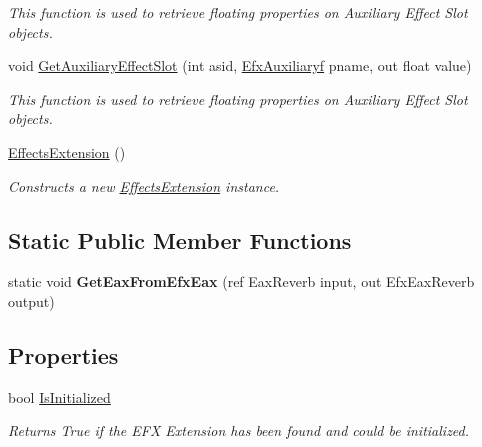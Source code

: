 \begin{DoxyCompactItemize}
\begin{DoxyCompactList}\small\item\em This function is used to retrieve floating properties on Auxiliary Effect Slot objects.\end{DoxyCompactList}\item 
void \hyperlink{class_open_t_k_1_1_audio_1_1_open_a_l_1_1_effects_extension_a5f6f92274a592df0ea8ab4dfd3780c37}{Get\-Auxiliary\-Effect\-Slot} (int asid, \hyperlink{namespace_open_t_k_1_1_audio_1_1_open_a_l_ad4eb76e6214aa11619cd342b8ab6acbd}{Efx\-Auxiliaryf} pname, out float value)
\begin{DoxyCompactList}\small\item\em This function is used to retrieve floating properties on Auxiliary Effect Slot objects.\end{DoxyCompactList}\item 
\hyperlink{class_open_t_k_1_1_audio_1_1_open_a_l_1_1_effects_extension_a1923f40f555058b0e102711601559731}{Effects\-Extension} ()
\begin{DoxyCompactList}\small\item\em Constructs a new \hyperlink{class_open_t_k_1_1_audio_1_1_open_a_l_1_1_effects_extension}{Effects\-Extension} instance. \end{DoxyCompactList}\end{DoxyCompactItemize}
\subsection*{Static Public Member Functions}
\begin{DoxyCompactItemize}
\item 
\hypertarget{class_open_t_k_1_1_audio_1_1_open_a_l_1_1_effects_extension_a0b335b4f0da12f920bf9cdd6f17a3df5}{static void {\bfseries Get\-Eax\-From\-Efx\-Eax} (ref Eax\-Reverb input, out Efx\-Eax\-Reverb output)}\label{class_open_t_k_1_1_audio_1_1_open_a_l_1_1_effects_extension_a0b335b4f0da12f920bf9cdd6f17a3df5}

\end{DoxyCompactItemize}
\subsection*{Properties}
\begin{DoxyCompactItemize}
\item 
bool \hyperlink{class_open_t_k_1_1_audio_1_1_open_a_l_1_1_effects_extension_a760975f853f917b2e4bcec05ffa73cca}{Is\-Initialized}
\begin{DoxyCompactList}\small\item\em Returns True if the E\-F\-X Extension has been found and could be initialized.\end{DoxyCompactList}\end{DoxyCompactItemize}


